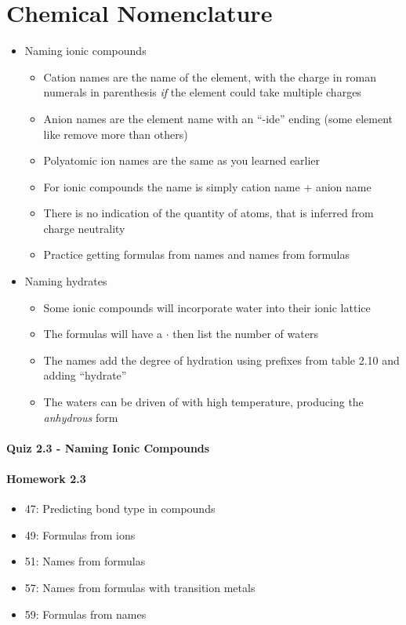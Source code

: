 \documentclass[12pt, openany, letterpaper]{memoir}
\begin{document}
\section{Chemical Nomenclature}
\begin{itemize}
  \item Naming ionic compounds
  \begin{itemize}
    \item Cation names are the name of the element, with the charge in roman numerals in parenthesis \emph{if} the element could take multiple charges
    \item Anion names are the element name with an ``-ide'' ending (some element like  remove more than others)
    \item Polyatomic ion names are the same as you learned earlier
    \item For ionic compounds the name is simply cation name + anion name
    \item There is no indication of the quantity of atoms, that is inferred from charge neutrality
    \item Practice getting formulas from names and names from formulas
  \end{itemize}
  \item Naming hydrates
  \begin{itemize}
    \item Some ionic compounds will incorporate water into their ionic lattice
    \item The formulas will have a $\cdot$ then list the number of waters
    \item The names add the degree of hydration using prefixes from table 2.10 and adding ``hydrate''
    \item The waters can be driven of with high temperature, producing the \emph{anhydrous} form
  \end{itemize}
\end{itemize}

\paragraph*{Quiz 2.3 - Naming Ionic Compounds}
\paragraph*{Homework 2.3}
\begin{itemize}
  \item 47: Predicting bond type in compounds
  \item 49: Formulas from ions
  \item 51: Names from formulas
  \item 57: Names from formulas with transition metals
  \item 59: Formulas from names
\end{itemize}
\end{document}
